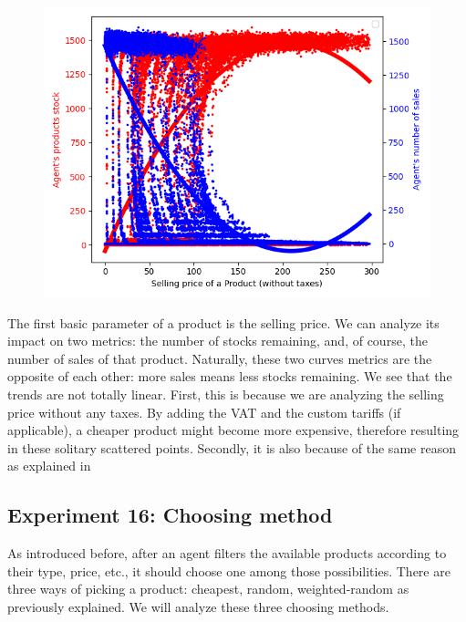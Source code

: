 {{{{{{{{{{{{{        \begin{figure}
            \includegraphics[width=\linewidth]{img/exp/15.png}
        \end{figure} 
        { The first basic parameter of a product is the selling price. We can analyze its impact on two metrics: the number of stocks remaining, and, of course, the number of sales of that product. Naturally, these two curves metrics are the opposite of each other: more sales means less stocks remaining. We see that the trends are not totally linear. First, this is because we are analyzing the selling price without any taxes. By adding the VAT and the custom tariffs (if applicable), a cheaper product might become more expensive, therefore resulting in these solitary scattered points. Secondly, it is also because of the same reason as explained in 
        \par


    \subsection{Experiment 16: Choosing method}
    As introduced before, after an agent filters the available products according to their type, price, etc., it should choose one among those possibilities. There are three ways of picking a product: cheapest, random, weighted-random as previously explained. We will analyze these three choosing methods.

}}}}}}}}}}}}}}
